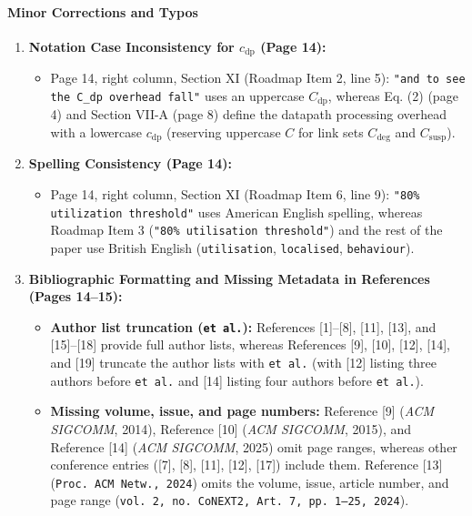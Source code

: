 \documentclass[11pt,a4paper]{article}
\begin{document}
\paragraph{Minor Corrections and Typos}
\begin{enumerate}[leftmargin=1.6em,itemsep=3pt]
\item \textbf{Notation Case Inconsistency for $c_{\text{dp}}$ (Page 14):}
\begin{itemize}[leftmargin=1.8em,itemsep=2pt]
\item Page 14, right column, Section XI (Roadmap Item 2, line 5): \texttt{"and to see the C\_dp overhead fall"} uses an uppercase $C_{\text{dp}}$, whereas Eq. (2) (page 4) and Section VII-A (page 8) define the datapath processing overhead with a lowercase $c_{\text{dp}}$ (reserving uppercase $C$ for link sets $C_{\text{deg}}$ and $C_{\text{susp}}$).
\end{itemize}
\item \textbf{Spelling Consistency (Page 14):}
\begin{itemize}[leftmargin=1.8em,itemsep=2pt]
\item Page 14, right column, Section XI (Roadmap Item 6, line 9): \texttt{"80\% utilization threshold"} uses American English spelling, whereas Roadmap Item 3 (\texttt{"80\% utilisation threshold"}) and the rest of the paper use British English (\texttt{utilisation}, \texttt{localised}, \texttt{behaviour}).
\end{itemize}
\item \textbf{Bibliographic Formatting and Missing Metadata in References (Pages 14–15):}
\begin{itemize}[leftmargin=1.8em,itemsep=2pt]
\item \textbf{Author list truncation (\texttt{et al.}):} References [1]–[8], [11], [13], and [15]–[18] provide full author lists, whereas References [9], [10], [12], [14], and [19] truncate the author lists with \texttt{et al.} (with [12] listing three authors before \texttt{et al.} and [14] listing four authors before \texttt{et al.}).
\item \textbf{Missing volume, issue, and page numbers:} Reference [9] (\emph{ACM SIGCOMM}, 2014), Reference [10] (\emph{ACM SIGCOMM}, 2015), and Reference [14] (\emph{ACM SIGCOMM}, 2025) omit page ranges, whereas other conference entries ([7], [8], [11], [12], [17]) include them. Reference [13] (\texttt{Proc. ACM Netw., 2024}) omits the volume, issue, article number, and page range (\texttt{vol. 2, no. CoNEXT2, Art. 7, pp. 1–25, 2024}).
\end{itemize}
\end{enumerate}
\end{document}
